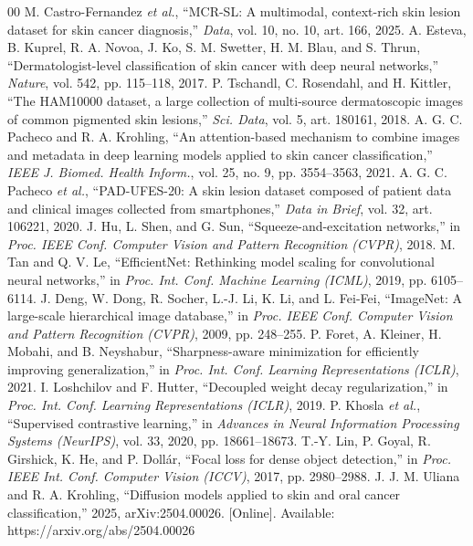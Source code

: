 \documentclass[conference]{IEEEtran}
\begin{document}
\begin{thebibliography}{00}
 M. Castro-Fernandez \emph{et al.}, ``MCR-SL: A multimodal, context-rich skin lesion dataset for skin cancer diagnosis,'' \emph{Data}, vol. 10, no. 10, art. 166, 2025.
 A. Esteva, B. Kuprel, R. A. Novoa, J. Ko, S. M. Swetter, H. M. Blau, and S. Thrun, ``Dermatologist-level classification of skin cancer with deep neural networks,'' \emph{Nature}, vol. 542, pp. 115--118, 2017.
 P. Tschandl, C. Rosendahl, and H. Kittler, ``The HAM10000 dataset, a large collection of multi-source dermatoscopic images of common pigmented skin lesions,'' \emph{Sci. Data}, vol. 5, art. 180161, 2018.
 A. G. C. Pacheco and R. A. Krohling, ``An attention-based mechanism to combine images and metadata in deep learning models applied to skin cancer classification,'' \emph{IEEE J. Biomed. Health Inform.}, vol. 25, no. 9, pp. 3554--3563, 2021.
 A. G. C. Pacheco \emph{et al.}, ``PAD-UFES-20: A skin lesion dataset composed of patient data and clinical images collected from smartphones,'' \emph{Data in Brief}, vol. 32, art. 106221, 2020.
 J. Hu, L. Shen, and G. Sun, ``Squeeze-and-excitation networks,'' in \emph{Proc. IEEE Conf. Computer Vision and Pattern Recognition (CVPR)}, 2018.
 M. Tan and Q. V. Le, ``EfficientNet: Rethinking model scaling for convolutional neural networks,'' in \emph{Proc. Int. Conf. Machine Learning (ICML)}, 2019, pp. 6105--6114.
 J. Deng, W. Dong, R. Socher, L.-J. Li, K. Li, and L. Fei-Fei, ``ImageNet: A large-scale hierarchical image database,'' in \emph{Proc. IEEE Conf. Computer Vision and Pattern Recognition (CVPR)}, 2009, pp. 248--255.
 P. Foret, A. Kleiner, H. Mobahi, and B. Neyshabur, ``Sharpness-aware minimization for efficiently improving generalization,'' in \emph{Proc. Int. Conf. Learning Representations (ICLR)}, 2021.
 I. Loshchilov and F. Hutter, ``Decoupled weight decay regularization,'' in \emph{Proc. Int. Conf. Learning Representations (ICLR)}, 2019.
 P. Khosla \emph{et al.}, ``Supervised contrastive learning,'' in \emph{Advances in Neural Information Processing Systems (NeurIPS)}, vol. 33, 2020, pp. 18661--18673.
 T.-Y. Lin, P. Goyal, R. Girshick, K. He, and P. Doll\'ar, ``Focal loss for dense object detection,'' in \emph{Proc. IEEE Int. Conf. Computer Vision (ICCV)}, 2017, pp. 2980--2988.
 J. J. M. Uliana and R. A. Krohling, ``Diffusion models applied to skin and oral cancer classification,'' 2025, arXiv:2504.00026. [Online]. Available: https://arxiv.org/abs/2504.00026

\end{thebibliography}
\end{document}
